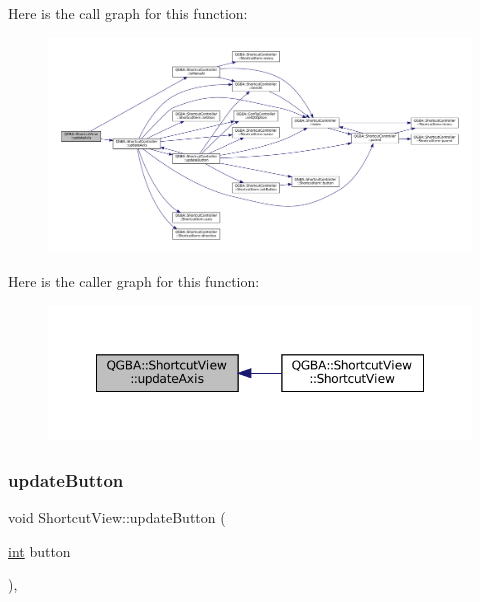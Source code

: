 Here is the call graph for this function\+:
\nopagebreak
\begin{figure}[H]
\begin{center}
\leavevmode
\includegraphics[width=350pt]{class_q_g_b_a_1_1_shortcut_view_a9d355b52b56584c687dd678031a41d97_cgraph}
\end{center}
\end{figure}
Here is the caller graph for this function\+:
\nopagebreak
\begin{figure}[H]
\begin{center}
\leavevmode
\includegraphics[width=348pt]{class_q_g_b_a_1_1_shortcut_view_a9d355b52b56584c687dd678031a41d97_icgraph}
\end{center}
\end{figure}
\mbox{\label{class_q_g_b_a_1_1_shortcut_view_a37a0e0d0e2720b112575f9b00739b7d4}} 
\subsubsection{\texorpdfstring{update\+Button}{updateButton}}
{\footnotesize\ttfamily void Shortcut\+View\+::update\+Button (\begin{DoxyParamCaption}\item[{\mbox{\hyperlink{ioapi_8h_a787fa3cf048117ba7123753c1e74fcd6}{int}}}]{button }\end{DoxyParamCaption})\hspace{0.3cm}{\ttfamily [private]}, {\ttfamily [slot]}}

